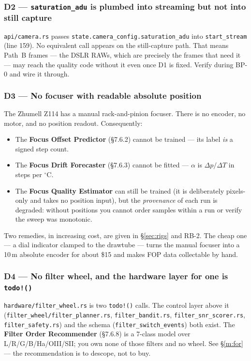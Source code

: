 \documentclass[11pt]{article}
\newcommand{\co}[1]{\texttt{\small #1}}
\begin{document}
\subsubsection*{D2 --- \co{saturation\_adu} is plumbed into streaming but not into still capture}

\co{api/camera.rs} passes \co{state.camera\_config.saturation\_adu} into
\co{start\_stream} (line 159). No equivalent call appears on the still-capture
path. That means Path~B frames --- the DSLR RAWs, which are precisely the frames
that need it --- may reach the quality code without it even once D1 is fixed.
Verify during BP-0 and wire it through.

\subsubsection*{D3 --- No focuser with readable absolute position}

The Zhumell Z114 has a manual rack-and-pinion focuser. There is no encoder, no
motor, and no position readout. Consequently:

\begin{itemize}
\item The \textbf{Focus Offset Predictor} (\S7.6.2) cannot be trained --- its
      label \emph{is} a signed step count.
\item The \textbf{Focus Drift Forecaster} (\S7.6.3) cannot be fitted --- $\alpha$
      is $\Delta p / \Delta T$ in steps per $^\circ$C.
\item The \textbf{Focus Quality Estimator} can still be trained (it is
      deliberately pixels-only and takes no position input), but the
      \emph{provenance} of each run is degraded: without positions you cannot
      order samples within a run or verify the sweep was monotonic.
\end{itemize}

Two remedies, in increasing cost, are given in \S\ref{sec:rigs} and RB-2. The cheap one ---
a dial indicator clamped to the drawtube --- turns the manual focuser into a
10\,\textmu m absolute encoder for about \$15 and makes FOP data collectable by
hand.

\subsubsection*{D4 --- No filter wheel, and the hardware layer for one is \co{todo!()}}

\co{hardware/filter\_wheel.rs} is two \co{todo!()} calls. The control layer
above it (\co{filter\_wheel/filter\_planner.rs}, \co{filter\_bandit.rs},
\co{filter\_snr\_scorer.rs}, \co{filter\_safety.rs}) and the schema
(\co{filter\_switch\_events}) both exist. The \textbf{Filter Order Recommender}
(\S7.6.8) is a 7-class model over L/R/G/B/Ha/OIII/SII; you own none of those
filters and no wheel. See \S\ref{m:for} --- the recommendation is to descope, not to
buy.
\end{document}
